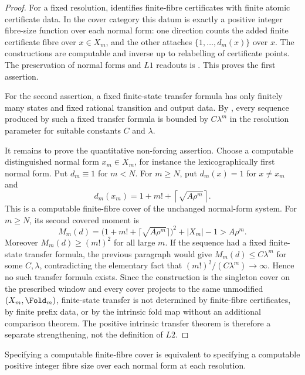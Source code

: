 \begin{proof}
For a fixed resolution,  identifies
finite-fibre certificates with finite atomic certificate data.  In the cover
category this datum is exactly a positive integer fibre-size function over each
normal form: one direction counts the added finite certificate fibre over
\(x\in X_m\), and the other attaches \(\{1,\ldots,d_m(x)\}\) over \(x\).  The
constructions are computable and inverse up to relabelling of certificate
points.  The preservation of normal forms and \(L1\) readouts is
.  This proves the first assertion.

For the second assertion, a fixed finite-state transfer formula has only
finitely many states and fixed rational transition and output data.  By
,
every sequence produced by such a fixed transfer formula is bounded by
\(C\lambda^m\) in the resolution parameter for suitable constants \(C\) and
\(\lambda\).

It remains to prove the quantitative non-forcing assertion.  Choose a computable
distinguished normal form \(x_m\in X_m\), for instance the lexicographically first
normal form.  Put \(d_m\equiv1\) for \(m<N\).  For \(m\ge N\), put
\(d_m(x)=1\) for \(x\ne x_m\) and
\[
  d_m(x_m)=1+m!+\left\lceil \sqrt{A\rho^m}\right\rceil .
\]
This is a computable finite-fibre cover of the unchanged normal-form system.
For \(m\ge N\), its second covered moment is
\[
  M_m(d)=\bigl(1+m!+\lceil\sqrt{A\rho^m}\rceil\bigr)^2+|X_m|-1>A\rho^m.
\]
Moreover \(M_m(d)\ge (m!)^2\) for all large \(m\).  If the sequence had a fixed
finite-state transfer formula, the previous paragraph would give
\(M_m(d)\le C\lambda^m\) for some \(C,\lambda\), contradicting the elementary
fact that \((m!)^2/(C\lambda^m)\to\infty\).  Hence no such transfer formula
exists.  Since the construction is the singleton cover on the prescribed window
and every cover projects to the same unmodified \((X_m,\Fold_m)\), finite-state
transfer is not determined by finite-fibre certificates, by finite prefix data,
or by the intrinsic fold map without an additional comparison theorem.  The
positive intrinsic transfer theorem is therefore a separate strengthening, not
the definition of \(L2\).
\end{proof}

\begin{theorem}
\label{thm:finite-fiber-cover-realization}
Specifying a computable finite-fibre cover is equivalent to specifying a
computable positive integer fibre size over each normal form at each resolution.
\end{theorem}

